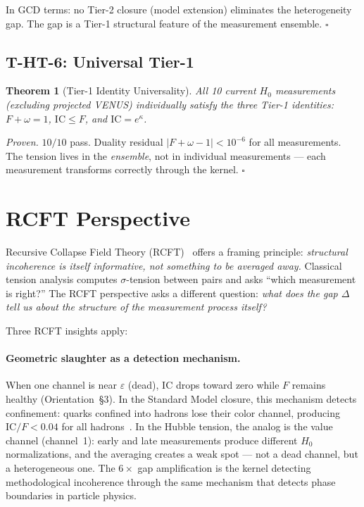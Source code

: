 \documentclass[
  aps,
  prd,
  twocolumn,
  superscriptaddress,
  nofootinbib,
  floatfix
]{revtex4-2}
\newtheorem{theorem}{Theorem}
\newcommand{\eps}{\varepsilon}
\newcommand{\IC}{\mathrm{IC}}
\newcommand{\hetgap}{\Delta}
\newcommand{\Fid}{F}
\newcommand{\Drft}{\omega}
\newcommand{\Logint}{\kappa}
\begin{document}
In GCD terms: no Tier-2 closure (model extension) eliminates
the heterogeneity gap.
The gap is a Tier-1 structural feature of the measurement ensemble.
\hfill$\square$

\subsection{T-HT-6: Universal Tier-1}

\begin{theorem}[Tier-1 Identity Universality]\label{thm:T6}
All 10 current $H_0$ measurements (excluding projected VENUS)
individually satisfy the three Tier-1 identities:
$\Fid + \Drft = 1$, $\IC \leq \Fid$, and $\IC = e^{\Logint}$.
\end{theorem}

\noindent\textit{Proven.}
$10/10$ pass. Duality residual $|\Fid + \Drft - 1| < 10^{-6}$
for all measurements.
The tension lives in the \emph{ensemble}, not in individual
measurements --- each measurement transforms correctly through
the kernel.  \hfill$\square$

\section{RCFT Perspective}\label{sec:rcft}

Recursive Collapse Field Theory (RCFT)~\cite{paulus2025rcft,paulus2025ucd}
offers a framing principle: \emph{structural incoherence is itself
informative, not something to be averaged away.}
Classical tension analysis computes $\sigma$-tension between pairs
and asks ``which measurement is right?''
The RCFT perspective asks a different question: \emph{what does
the gap $\hetgap$ tell us about the structure of the measurement
process itself?}

Three RCFT insights apply:

\paragraph{Geometric slaughter as a detection mechanism.}
When one channel is near $\eps$ (dead), $\IC$ drops toward zero
while $\Fid$ remains healthy (Orientation~\S3).
In the Standard Model closure, this mechanism detects confinement:
quarks confined into hadrons lose their color channel, producing
$\IC/\Fid < 0.04$ for all hadrons~\cite{paulus2025physicscoherence}.
In the Hubble tension, the analog is the value channel (channel~1):
early and late measurements produce different $H_0$ normalizations,
and the averaging creates a weak spot --- not a dead channel, but
a heterogeneous one.
The $6\times$ gap amplification is the kernel detecting
methodological incoherence through the same mechanism that
detects phase boundaries in particle physics.
\end{document}
